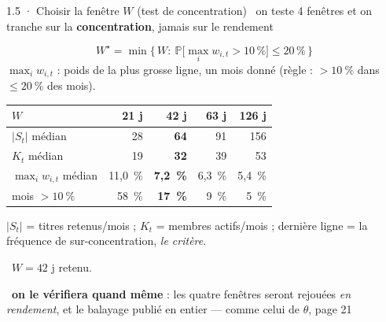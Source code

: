 \documentclass[11pt,aspectratio=169]{beamer}
\newcommand{\obs}[1]{{\color{bleu}\scriptsize\textbullet}~{\scriptsize #1}\par\vspace{0.4mm}}
\newcommand{\lire}[1]{{\scriptsize\color{grisf}#1}}
\newcommand{\sortie}[1]{{\scriptsize\color{vert}\textbf{\checkmark}~#1}\par}
\begin{document}
\begin{frame}{1.5 · Choisir la fenêtre $W$ (test de concentration)}
  \obs{on teste 4 fenêtres et on tranche sur la \textbf{concentration}, jamais sur le rendement}
  \vspace{-1mm}
  {\footnotesize\[ W^\star = \min\bigl\{\, W :\ \mathbb P\bigl[\max_i w_{i,t} > 10\,\%\bigr]
     \leq 20\,\% \,\bigr\} \]}
  \vspace{-1mm}
  \lire{$\max_i w_{i,t}$ : poids de la plus grosse ligne, un mois donné (règle : $> 10~\%$ dans
   $\leq 20~\%$ des mois).}
  \par\vspace{1.5mm}
  \centering
  {\footnotesize\setlength{\tabcolsep}{8pt}
  \begin{tabular}{@{}l r r r r@{}}
    \toprule
    $W$ & 21 j & \textbf{42 j} & 63 j & 126 j\\
    \midrule
    $|S_t|$ médian      & 28      & \textbf{64}      & 91     & 156\\
    $K_t$ médian        & 19      & \textbf{32}      & 39     & 53\\
    $\max_i w_{i,t}$ médian & 11,0~\% & \textbf{7,2~\%} & 6,3~\% & 5,4~\%\\
    mois $> 10~\%$      & 58~\%   & \textbf{17~\%}   & 9~\%   & 5~\%\\
    \bottomrule
  \end{tabular}}
  \par\vspace{1.5mm}
  \raggedright
  \lire{$|S_t|$ = titres retenus/mois ; $K_t$ = membres actifs/mois ; dernière ligne = la
   fréquence de sur-concentration, \emph{le critère}.}
  \par\vspace{1.5mm}
  \sortie{$W = 42$ j retenu.}
  \vspace{0.5mm}
  \obs{\textbf{on le vérifiera quand même} : les quatre fenêtres seront rejouées \emph{en
   rendement}, et le balayage publié en entier --- comme celui de $\theta$, page 21}
\end{frame}
\end{document}
